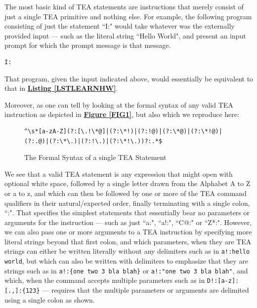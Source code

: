 \documentclass[a4paper, 18pt]{book} %
\begin{document}
{{{\begin{appendices}
The most basic kind of TEA statements are instructions that merely consist of just a single TEA primitive and nothing else. For example, the following program consisting of just the statement ``I:" would take whatever was the externally provided input --- such as the literal string ``Hello World", and present an input prompt for which the prompt message is that message.

\vspace{2em}
  \begin{tcolorbox}[teaterminalstyle, title=LEARN PROGRAMMING: Simplest TEA Statements, breakable]
  \begin{lstlisting}[language=TEA,breaklines=true,]
I:
   \end{lstlisting}
  \end{tcolorbox}
\vspace{2em}

That program, given the input indicated above, would essentially be equivalent to that in \textbf{\hyperref[LSTLEARNHW]{Listing \ref{LSTLEARNHW}}}. 

\vspace{2em}

Moreover, as one can tell by looking at the formal syntax of any valid TEA instruction as depicted in \textbf{\hyperref[FIG1]{Figure \ref{FIG1}}}, but also which we reproduce here:


\begin{figure}[H]
  \centering
  \begin{tcolorbox}[myterminalstyle, title=TEA Instruction Line (Regular Expression)]
  \begin{lstlisting}
^\s*[a-zA-Z](?:[\.!\*@]|(?:\*!)|(?:!@)|(?:\*@)|(?:\*!@)|(?:.@)|(?:\*\.)|(?:!\.)|(?:\*!\.))?:.*$
  \end{lstlisting}
  \end{tcolorbox}
  \caption{The Formal Syntax of a single TEA Statement}
  \label{FIGLEARNTEAPROG}
\end{figure}

\vspace{2em}

We see that a valid TEA statement is any expression that might open with optional white space, followed by a single letter drawn from the Alphabet A to Z or a to z, and which can then be followed by one or more of the TEA command qualifiers in their natural/expected order, finally terminating with a single colon, ``:". That specifies the simplest statements that essentially bear no parameters or arguments for the instruction --- such as just ``a:", ``a!:", ``C@:" or ``Z*:". However, we can also pass one or more arguments to a TEA instruction by specifying more literal strings beyond that first colon, and which parameters, when they are TEA strings can either be written literally without any delimiters such as in \texttt{a!:hello world}, but which can also be written with delimiters to emphasize that they are strings such as in \texttt{a!:\{one two 3 bla blah\}} or  \texttt{a!:"one two 3 bla blah"}, and which, when the command accepts multiple parameters such as in \texttt{D!:[a-z]:[.,]:\{123\}} --- requires that the multiple parameters or arguments are delimited using a single colon as shown.



\end{appendices}}}}
\end{document}

